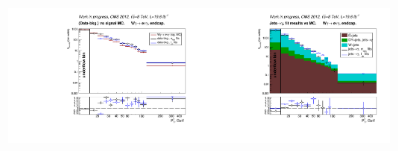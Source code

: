 \begin{frame}
\begin{figure}[htb]
\begin{center}
       \includegraphics[width=0.45\textwidth]{../figs/figs_v11/ELECTRON_WGamma/PrepareYields/c_BkgSubtrDATAvsSIGMC_c_ELECTRON_WGamma__UNblind__Endcap__phoEt.pdf}\includegraphics[width=0.45\textwidth]{../figs/figs_v11/ELECTRON_WGamma/PrepareYields/c_FakeDDvsMC_c_ELECTRON_WGamma__UNblind__Endcap__phoEt.pdf}\\
    \end{center}
  \end{figure}
\end{frame}%
